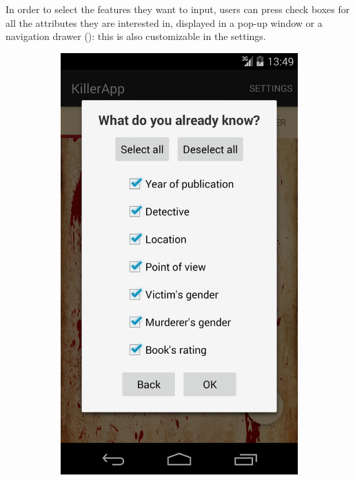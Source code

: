 \documentclass{mproj}
\begin{document}
In order to select the features they want to input, users can press check boxes for all the attributes they are interested in, displayed in a pop-up window or a navigation drawer (): this is also customizable in the settings.

\begin{figure}[h]
	\centering
	\begin{subfigure}{0.3\textwidth}
		\includegraphics[width=\textwidth]{images/attributes_dialog}		

\end{subfigure}
\end{figure}
\end{document}
